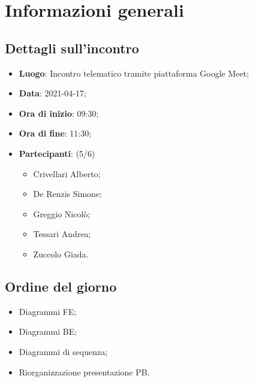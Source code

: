 \section{Informazioni generali}

\subsection{Dettagli sull'incontro}
\begin{itemize}
\item \textbf{Luogo}: Incontro telematico tramite piattaforma Google Meet;
\item \textbf{Data}: 2021-04-17;
\item \textbf{Ora di inizio}: 09:30;
\item \textbf{Ora di fine}: 11:30;
\item \textbf{Partecipanti}: (5/6) 
\begin{itemize}
	\item Crivellari Alberto;
	\item De Renzis Simone;
	\item Greggio Nicolò;
	\item Tessari Andrea;
	\item Zuccolo Giada.
\end{itemize}
\end{itemize}

\subsection{Ordine del giorno}
\begin{itemize}
	\item Diagrammi FE;
	\item Diagrammi BE;
	\item Diagrammi di sequenza;
	\item Riorganizzazione presentazione PB.
\end{itemize}


